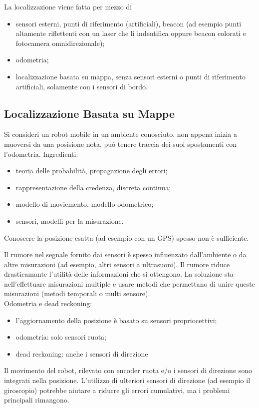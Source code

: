 \documentclass[a4paper,portrait,12pt]{article}
\theoremstyle{definition}
\begin{document}
La localizzazione viene fatta per mezzo di
\begin{itemize}
\item sensori esterni, punti di riferimento (artificiali), beacon (ad esempio punti altamente riflettenti con un laser che li indentifica oppure beacon colorati e fotocamera omnidirezionale);
\item odometria;
\item localizzazione basata su mappa, senza sensori esterni o punti di riferimento artificiali, solamente con i sensori di bordo.
\end{itemize}


\subsection{Localizzazione Basata su Mappe}

Si consideri un robot mobile in un ambiente conosciuto, non appena inizia a muoversi da una posisione nota, può tenere traccia dei suoi spostamenti con l'odometria.
Ingredienti:
\begin{itemize}
\item teoria delle probabilità, propagazione degli errori;
\item rappresentazione della credenza, discreta continua;
\item modello di moviemento, modello odometrico;
\item sensori, modelli per la misurazione.
\end{itemize}
Conoscere la posizione esatta (ad esempio con un GPS) spesso non è sufficiente.

Il rumore nel segnale fornito dai sensori è spesso influenzato dall'ambiente o da altre misurazioni (ad esempio, altri sensori a ultrasuoni).
Il rumore riduce drasticamante l'utilità delle informazioni che si ottengono.
La soluzione sta nell'effettuare misurazioni multiple e usare metodi che permettano di unire queste misurazioni (metodi temporali o multi sensore).\\

Odometria e dead reckoning:
\begin{itemize}
\item l'aggiornamento della posizione è basato su sensori propriocettivi;
\item odometria: solo sensori ruota;
\item dead reckoning: anche i sensori di direzione 
\end{itemize}
Il movimento del robot, rilevato con encoder ruota e/o i sensori di direzione sono integrati nella posizione.
L'utilizzo di ulteriori sensori di direzione (ad esempio il giroscopio) potrebbe aiutare a ridurre gli errori cumulativi, ma i problemi principali rimangono.
\end{document}
